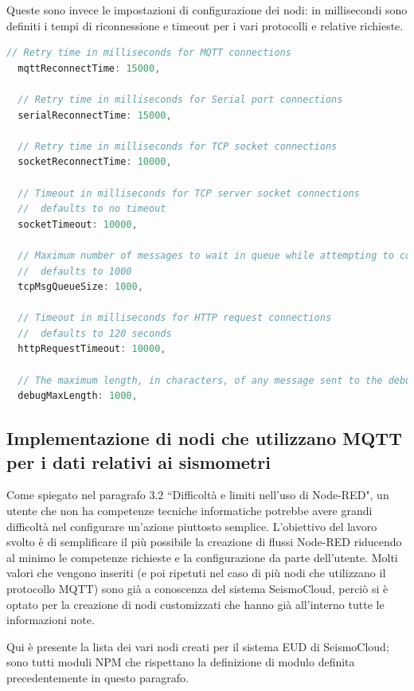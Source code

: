 \documentclass[a4paper,10pt]{memoir}
\begin{document}
Queste sono invece le impostazioni di configurazione dei nodi:
in millisecondi sono definiti i tempi di riconnessione e timeout per i vari protocolli e relative richieste.
\begin{lstlisting}[language=Javascript]
  // Retry time in milliseconds for MQTT connections
  mqttReconnectTime: 15000,

  // Retry time in milliseconds for Serial port connections
  serialReconnectTime: 15000,

  // Retry time in milliseconds for TCP socket connections
  socketReconnectTime: 10000,

  // Timeout in milliseconds for TCP server socket connections
  //  defaults to no timeout
  socketTimeout: 10000,

  // Maximum number of messages to wait in queue while attempting to connect to TCP socket
  //  defaults to 1000
  tcpMsgQueueSize: 1000,

  // Timeout in milliseconds for HTTP request connections
  //  defaults to 120 seconds
  httpRequestTimeout: 10000,

  // The maximum length, in characters, of any message sent to the debug sidebar tab
  debugMaxLength: 1000,
\end{lstlisting}

\subsection{Implementazione di nodi che utilizzano MQTT per i dati relativi ai sismometri}

Come spiegato nel paragrafo 3.2 ``Difficoltà e limiti nell'uso di Node-RED", un utente che non ha competenze tecniche informatiche potrebbe avere grandi difficoltà nel configurare un'azione piuttosto semplice.
L'obiettivo del lavoro svolto è di semplificare il più possibile la creazione di flussi Node-RED riducendo al minimo le competenze richieste e la configurazione da parte dell'utente.
Molti valori che vengono inseriti (e poi ripetuti nel caso di più nodi che utilizzano il protocollo MQTT) sono già a conoscenza del sistema SeismoCloud, perciò si è optato per la creazione di nodi customizzati che hanno già all'interno tutte le informazioni note.

Qui è presente la lista dei vari nodi creati per il sistema EUD di SeismoCloud; sono tutti moduli NPM che rispettano la definizione di modulo definita precedentemente in questo paragrafo.
\end{document}
